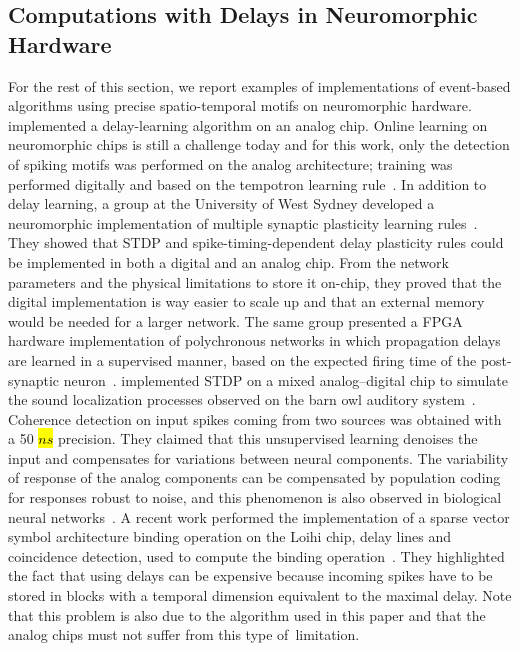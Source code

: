 \documentclass[brainsci, %
               review,accept,pdftex,moreauthors
               ]{Definitions/mdpi}
\begin{document}
\subsection{Computations with Delays in Neuromorphic Hardware}
%
For the rest of this section, we report examples of implementations of event-based algorithms using precise spatio-temporal motifs on neuromorphic hardware. 
\citep{hussain_deltron_2012} implemented a delay-learning algorithm on an analog chip. Online learning on neuromorphic chips is still a challenge today and for this work, only the detection of spiking motifs was performed on the analog architecture; training was performed digitally and based on the tempotron learning rule~\citep{gutig_tempotron_2006}. In addition to delay learning, a group at the University of West Sydney developed a neuromorphic implementation of multiple synaptic plasticity learning rules~\citep{wang_neuromorphic_2015}. They showed that STDP and spike-timing-dependent delay plasticity rules could be implemented in both a digital and an analog chip. From the network parameters and the physical limitations to store it on-chip, they proved that the digital implementation is way easier to scale up and that an external memory would be needed for a larger network. The same group presented a FPGA hardware implementation of polychronous networks in which propagation delays are learned in a supervised manner, based on the expected firing time of the post-synaptic neuron~\citep{wang_fpga_2014}. %
\citet{pfeil_neuromorphic_2013} implemented STDP on a mixed analog--digital chip to simulate the sound localization processes observed on the barn owl auditory system~\citep{gerstner_neuronal_1996}. Coherence detection on input spikes coming from two sources was obtained with a 50 \hl{$ns$} precision. They claimed that this unsupervised learning denoises the input and compensates for variations between neural components. The variability of response of the analog components can be compensated by population coding for responses robust to noise, and this phenomenon is also observed in biological neural networks~\citep{boerlin_spike-based_2011}. 
A recent work performed the implementation of a sparse vector symbol architecture binding operation on the Loihi chip, delay lines and coincidence detection, used to compute the binding operation~\citep{renner_sparse_2022}. They highlighted the fact that using delays can be expensive  because incoming spikes have to be stored in blocks with a temporal dimension equivalent to the maximal delay. Note that this problem is also due to the algorithm used in this paper and that the analog chips must not suffer from this type of~limitation. 
\end{document}
